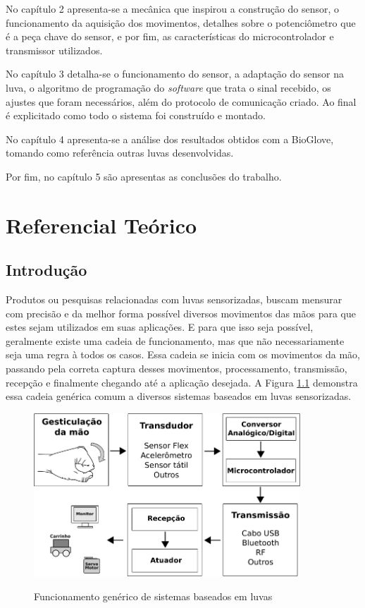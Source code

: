 \documentclass[
	12pt,				%
	openright,			%
	oneside,			%
	a4paper,			%
	english,			%
	brazil				%
	]{abntex2}
\begin{document}
		No capítulo 2 apresenta-se a mecânica que inspirou a construção do sensor, o funcionamento da aquisição dos movimentos, detalhes sobre o potenciômetro que é a peça chave do sensor, e por fim, as características do microcontrolador e transmissor utilizados.
		
		No capítulo 3 detalha-se o funcionamento do sensor, a adaptação do sensor na luva, o algoritmo de programação do \textit{software} que trata o sinal recebido, os ajustes que foram necessários, além do protocolo de comunicação criado. Ao final é explicitado como todo o sistema foi construído e montado.

		No capítulo 4 apresenta-se a análise dos resultados obtidos com a BioGlove, tomando como referência outras luvas desenvolvidas.

		Por fim, no capítulo 5 são apresentas as conclusões do trabalho.
		





	
	\chapter{Referencial Teórico}

		\section{Introdução}



		Produtos ou pesquisas relacionadas com luvas sensorizadas, buscam mensurar com precisão e da melhor forma possível diversos movimentos das mãos para que estes sejam utilizados em suas aplicações. E para que isso seja possível, geralmente existe uma cadeia de funcionamento, mas que não necessariamente seja uma regra à todos os casos. Essa cadeia se inicia com os movimentos da mão, passando pela correta captura desses movimentos, processamento, transmissão, recepção e finalmente chegando até a aplicação desejada. A Figura \ref{Fig:flowchart1} demonstra essa cadeia genérica comum a diversos sistemas baseados em luvas sensorizadas.

		\begin{figure}[h!]
			\centering
			\caption{Funcionamento genérico de sistemas baseados em luvas}
  		\includegraphics[width=10cm]{./figures/flowchart1.png}
  		\label{Fig:flowchart1}
		\end{figure}
\end{document}
